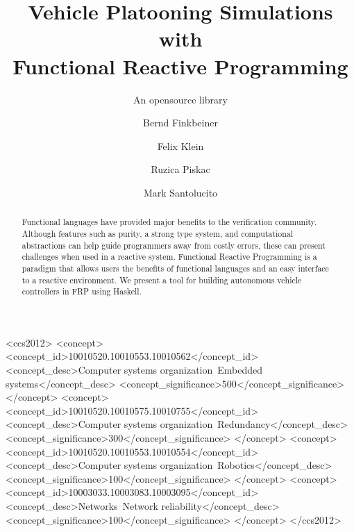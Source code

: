 \documentclass[sigconf]{acmart}
\begin{document}
\title{Vehicle Platooning Simulations with \\ Functional Reactive Programming}
\subtitle{An opensource library}

\author{Bernd Finkbeiner}

\author{Felix Klein}

\author{Ruzica Piskac}

\author{Mark Santolucito}

\begin{abstract}
Functional languages have provided major benefits to the verification community.
Although features such as purity, a strong type system, and computational abstractions can help guide programmers away from costly errors, these can present challenges when used in a reactive system.
Functional Reactive Programming is a paradigm that allows users the benefits of functional languages and an easy interface to a reactive environment.
We present a tool for building autonomous vehicle controllers in FRP using Haskell.
\end{abstract}

%
%
\begin{CCSXML}
<ccs2012>
 <concept>
  <concept_id>10010520.10010553.10010562</concept_id>
  <concept_desc>Computer systems organization~Embedded systems</concept_desc>
  <concept_significance>500</concept_significance>
 </concept>
 <concept>
  <concept_id>10010520.10010575.10010755</concept_id>
  <concept_desc>Computer systems organization~Redundancy</concept_desc>
  <concept_significance>300</concept_significance>
 </concept>
 <concept>
  <concept_id>10010520.10010553.10010554</concept_id>
  <concept_desc>Computer systems organization~Robotics</concept_desc>
  <concept_significance>100</concept_significance>
 </concept>
 <concept>
  <concept_id>10003033.10003083.10003095</concept_id>
  <concept_desc>Networks~Network reliability</concept_desc>
  <concept_significance>100</concept_significance>
 </concept>
</ccs2012>  
\end{CCSXML}
\end{document}
